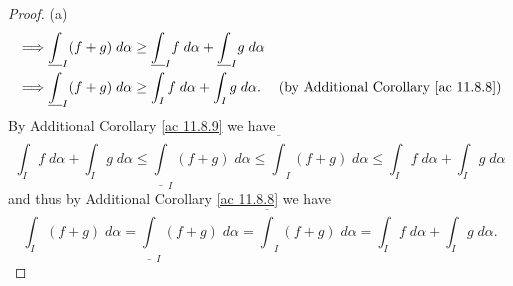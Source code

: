 \begin{proof}{(a)}
\begin{align*}
        \implies & \underline{\int}_I (f + g) \; d \alpha \geq \underline{\int}_I f \; d \alpha + \underline{\int}_I g \; d \alpha &                                                     \\
        \implies & \underline{\int}_I (f + g) \; d \alpha \geq \int_I f \; d \alpha + \int_I g \; d \alpha.                        & \text{(by Additional Corollary \ref{ac 11.8.8})}
    \end{align*}
    By Additional Corollary \ref{ac 11.8.9} we have
    \[
        \int_I f \; d \alpha + \int_I g \; d \alpha \leq \underline{\int}_I (f + g) \; d \alpha \leq \overline{\int}_I (f + g) \; d \alpha \leq \int_I f \; d \alpha + \int_I g \; d \alpha
    \]
    and thus by Additional Corollary \ref{ac 11.8.8} we have
    \[
        \int_I (f + g) \; d \alpha = \underline{\int}_I (f + g) \; d \alpha = \overline{\int}_I (f + g) \; d \alpha = \int_I f \; d \alpha + \int_I g \; d \alpha.
    \]
\end{proof}

